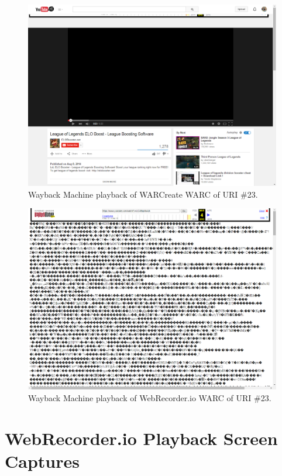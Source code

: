 \documentclass[a4paper,12pt]{article}
\begin{document}
\begin{appendices}
\begin{figure}[H]
    \includegraphics[scale=0.5]{images/23_warcreate_in_wayback.png}
    \caption{Wayback Machine playback of WARCreate WARC of URI \#23.}
\end{figure}
\begin{figure}[H]
    \centering
    \includegraphics[scale=0.5]{images/23_webrecorder_in_wayback.png}
    \caption{Wayback Machine playback of WebRecorder.io WARC of URI \#23.}
\end{figure}

\section{WebRecorder.io Playback Screen Captures}


\end{appendices}
\end{document}
